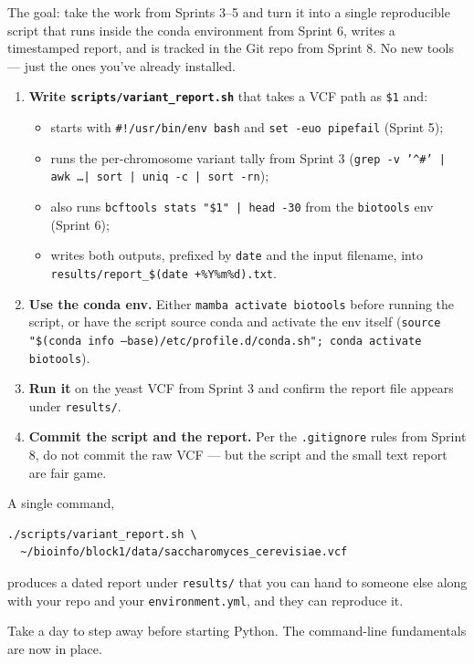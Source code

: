 The goal: take the work from Sprints 3--5 and turn it into a single reproducible script that runs inside the conda environment from Sprint 6, writes a timestamped report, and is tracked in the Git repo from Sprint 8. No new tools --- just the ones you've already installed.
\begin{enumerate}[nosep]
  \item \textbf{Write \texttt{scripts/variant\_report.sh}} that takes a VCF path as \texttt{\$1} and:
    \begin{itemize}[nosep]
      \item starts with \texttt{\#!/usr/bin/env bash} and \texttt{set -euo pipefail} (Sprint 5);
      \item runs the per-chromosome variant tally from Sprint 3 (\texttt{grep -v '\textasciicircum\#' | awk \ldots | sort | uniq -c | sort -rn});
      \item also runs \texttt{bcftools stats "\$1" | head -30} from the \texttt{biotools} env (Sprint 6);
      \item writes both outputs, prefixed by \texttt{date} and the input filename, into \texttt{results/report\_\$(date +\%Y\%m\%d).txt}.
    \end{itemize}
  \item \textbf{Use the conda env.} Either \texttt{mamba activate biotools} before running the script, or have the script source conda and activate the env itself (\texttt{source "\$(conda info --base)/etc/profile.d/conda.sh"; conda activate biotools}).
  \item \textbf{Run it} on the yeast VCF from Sprint 3 and confirm the report file appears under \texttt{results/}.
  \item \textbf{Commit the script and the report.} Per the \texttt{.gitignore} rules from Sprint 8, do not commit the raw VCF --- but the script and the small text report are fair game.
\end{enumerate}
\begin{winbox}[Checkpoint]
A single command,
\begin{lstlisting}
./scripts/variant_report.sh \
  ~/bioinfo/block1/data/saccharomyces_cerevisiae.vcf
\end{lstlisting}
produces a dated report under \texttt{results/} that you can hand to someone else along with your repo and your \texttt{environment.yml}, and they can reproduce it.
\end{winbox}

\begin{restbox}
Take a day to step away before starting Python. The command-line fundamentals are now in place.
\end{restbox}

